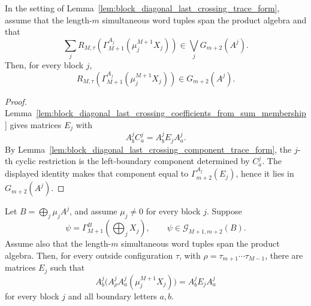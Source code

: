 \begin{lemma}
    \label{lem:block_diagonal_last_crossing_component_membership_from_sum_membership}
    \leanok
    In the setting of Lemma~\ref{lem:block_diagonal_last_crossing_trace_form},
    assume that the length-\(m\) simultaneous word tuples span the product
    algebra and that
    \[
        \sum_j
        R_{M,\tau}\!\left(\Gamma_{M+1}^{A_j}(\mu_j^{M+1}X_j)\right)
        \in \bigvee_j G_{m+2}(A^j).
    \]
    Then, for every block \(j\),
    \[
        R_{M,\tau}\!\left(\Gamma_{M+1}^{A_j}(\mu_j^{M+1}X_j)\right)
        \in G_{m+2}(A^j).
    \]
\end{lemma}

\begin{proof}
    \leanok
    Lemma~\ref{lem:block_diagonal_last_crossing_coefficients_from_sum_membership}
    gives matrices \(E_j\) with
    \[
        A^j_bC^j_a=A^j_bE_jA^j_a.
    \]
    By Lemma~\ref{lem:block_diagonal_last_crossing_component_trace_form}, the
    \(j\)-th cyclic restriction is the left-boundary component determined by
    \(C^j_a\). The displayed identity makes that component equal to
    \(\Gamma_{m+2}^{A_j}(E_j)\), hence it lies in \(G_{m+2}(A^j)\).
\end{proof}

\begin{lemma}
    \label{lem:block_diagonal_last_crossing_coefficients_from_chain_ground_space}
    \leanok
    Let \(B=\bigoplus_j\mu_jA^j\), and assume \(\mu_j\ne0\) for every block
    \(j\). Suppose
    \[
        \psi=\Gamma_{M+1}^{B}\!\left(\bigoplus_jX_j\right),
        \qquad
        \psi\in\mathcal G_{M+1,m+2}(B).
    \]
    Assume also that the length-\(m\) simultaneous word tuples span the product
    algebra. Then, for every outside configuration \(\tau\), with
    \(\rho=\tau_{m+1}\cdots\tau_{M-1}\), there are matrices \(E_j\) such that
    \[
        A^j_b\bigl(A^j_\rho A^j_a(\mu_j^{M+1}X_j)\bigr)
        =
        A^j_bE_jA^j_a
    \]
    for every block \(j\) and all boundary letters \(a,b\).
\end{lemma}

